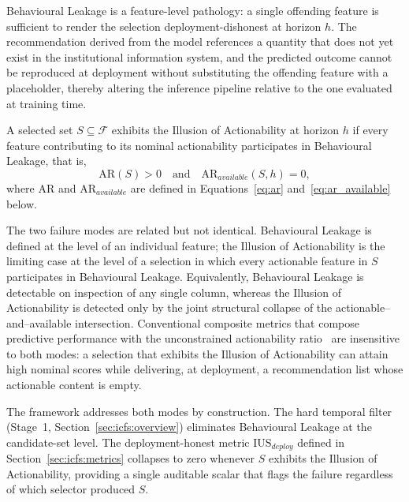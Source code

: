 \documentclass[a4paper,fleqn]{cas-sc}
\begin{document}
Behavioural Leakage is a feature-level pathology: a single offending feature is sufficient to render the selection deployment-dishonest at horizon $h$. The recommendation derived from the model references a quantity that does not yet exist in the institutional information system, and the predicted outcome cannot be reproduced at deployment without substituting the offending feature with a placeholder, thereby altering the inference pipeline relative to the one evaluated at training time.

\begin{definition}
\label{def:illusion_actionability}
A selected set $S \subseteq \mathcal{F}$ exhibits the Illusion of Actionability at horizon $h$ if every feature contributing to its nominal actionability participates in Behavioural Leakage, that is,
\begin{equation}
    \mathrm{AR}(S) > 0 \quad \text{and} \quad
    \mathrm{AR}_{available}(S, h) = 0,
    \label{eq:illusion_actionability}
\end{equation}
where $\mathrm{AR}$ and $\mathrm{AR}_{available}$ are defined in Equations~\eqref{eq:ar} and~\eqref{eq:ar_available} below.
\end{definition}

The two failure modes are related but not identical. Behavioural Leakage is defined at the level of an individual feature; the Illusion of Actionability is the limiting case at the level of a selection in which every actionable feature in $S$ participates in Behavioural Leakage. Equivalently, Behavioural Leakage is detectable on inspection of any single column, whereas the Illusion of Actionability is detected only by the joint structural collapse of the actionable--and--available intersection. Conventional composite metrics that compose predictive performance with the unconstrained actionability ratio~\citep{baker2014,siemens2012} are insensitive to both modes: a selection that exhibits the Illusion of Actionability can attain high nominal scores while delivering, at deployment, a recommendation list whose actionable content is empty.

The framework addresses both modes by construction. The hard temporal filter (Stage~1, Section~\ref{sec:icfs:overview}) eliminates Behavioural Leakage at the candidate-set level. The deployment-honest metric $\mathrm{IUS}_{deploy}$ defined in Section~\ref{sec:icfs:metrics} collapses to zero whenever $S$ exhibits the Illusion of Actionability, providing a single auditable scalar that flags the failure regardless of which selector produced $S$.
\end{document}
